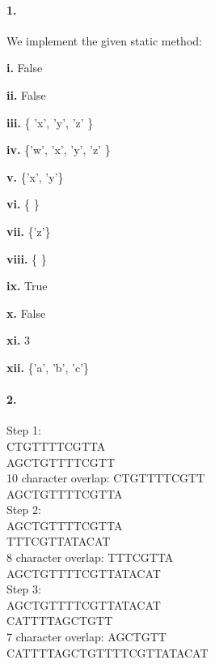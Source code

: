 \documentclass[10pt]{article}
\begin{document}
\maketitle

\paragraph{1. } We implement the given static method: 
\begin{list}{}
\item{\textbf{i.}} False
\item{\textbf{ii.}} False
\item{\textbf{iii.}} \{ 'x', 'y', 'z' \}
\item{\textbf{iv.}} \{'w', 'x', 'y', 'z' \}
\item{\textbf{v.}} \{'x', 'y'\}
\item{\textbf{vi.}} \{ \}
\item{\textbf{vii.}} \{'z'\}
\item{\textbf{viii.}} \{ \}
\item{\textbf{ix.}} True
\item{\textbf{x.}} False
\item{\textbf{xi.}} 3
\item{\textbf{xii.}} \{'a', 'b', 'c'\}\\
\end{list}
\paragraph{2. }
Step 1: \\
CTGTTTTCGTTA\\
AGCTGTTTTCGTT\\
10 character overlap: CTGTTTTCGTT\\
AGCTGTTTTCGTTA\\

Step 2: \\
AGCTGTTTTCGTTA\\
TTTCGTTATACAT\\
8 character overlap: TTTCGTTA\\
AGCTGTTTTCGTTATACAT\\

Step 3: \\
AGCTGTTTTCGTTATACAT\\
CATTTTAGCTGTT\\
7 character overlap: AGCTGTT\\
CATTTTAGCTGTTTTCGTTATACAT\\
\end{document}
